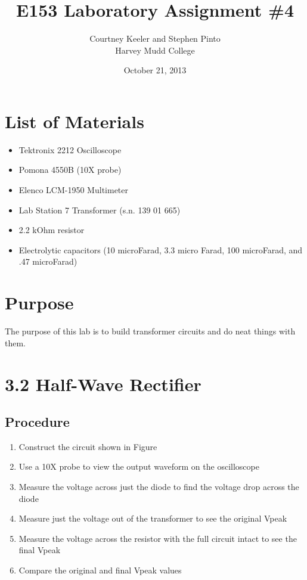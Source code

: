 \documentclass[12pt,letterpaper]{report}
\begin{document}
\title{E153 Laboratory Assignment \#4}
\author{Courtney Keeler and Stephen Pinto\\
Harvey Mudd College}
\date{October 21, 2013}
\maketitle

\section*{List of Materials}
\begin{itemize}
	\item Tektronix 2212 Oscilloscope
	\item Pomona 4550B (10X probe)
	\item Elenco LCM-1950 Multimeter
	\item Lab Station 7 Transformer (s.n. 139 01 665)
	\item 2.2 kOhm resistor
	\item Electrolytic capacitors (10 microFarad, 3.3 micro Farad, 100 microFarad, and .47 microFarad)
\end{itemize}

\section*{Purpose}
The purpose of this lab is to build transformer circuits and do neat things with them.

\section*{3.2 Half-Wave Rectifier}
\subsection*{Procedure}

\begin{enumerate}
\item Construct the circuit shown in Figure %
\item Use a 10X probe to view the output waveform on the oscilloscope
\item Measure the voltage across just the diode to find the voltage drop across the diode
\item Measure just the voltage out of the transformer to see the original Vpeak
\item Measure the voltage across the resistor with the full circuit intact to see the final Vpeak
\item Compare the original and final Vpeak values
\end{enumerate}
\end{document}

